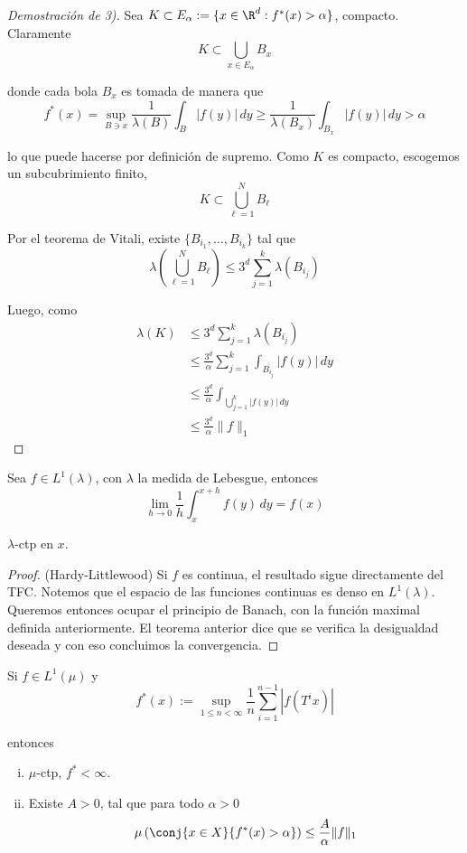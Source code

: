\documentclass[	docname= Sistemas\ Din\'amicos,
				finished=1,
				semester=1,
				year=2017,
				professor=Godofredo\ Iommi,
				sigla=MAT2565]{apunte}
\begin{document}
\begin{proof}[Demostración de 3)] Sea $K \subset E_{\alpha} := \{x \in \R^{d} : f^{*}(x) > \alpha\}$, compacto. Claramente
	$$K \subset \bigcup_{x \in E_{\alpha}} B_{x}$$

donde cada bola $B_{x}$ es tomada de manera que
	$$f^{*}(x) 
		=	\sup_{B \ni x} \frac{1}{\lambda(B)} \int_{B} |f(y)| \, dy 
		\geq	\frac{1}{\lambda(B_{x})} \int_{B_{x}} |f(y)| \, dy
		>	\alpha
	$$

lo que puede hacerse por definición de supremo. Como $K$ es compacto, escogemos un subcubrimiento finito,
	$$K \subset \bigcup_{\ell=1}^{N} B_{\ell}$$

Por el teorema de Vitali, existe $\{B_{i_{1}}, \ldots, B_{i_{k}}\}$ tal que
	$$\lambda\left(\bigcup_{\ell=1}^{N} B_{\ell}\right) \leq 3^{d} \sum_{j=1}^{k} \lambda(B_{i_{j}})$$

Luego, como 
	\begin{align*}
		\lambda(K) 
			&\leq		3^{d} \sum_{j=1}^{k} \lambda(B_{i_{j}})	\\
			&\leq		\frac{3^{d}}{\alpha}\sum_{j=1}^{k} \int_{B_{i_{j}}} |f(y)| \, dy	\\
			&\leq		\frac{3^{d}}{\alpha} \int_{\bigcup_{j=1}^{k} |f(y)| \, dy}	\\
			&\leq		\frac{3^{d}}{\alpha}\|f\|_{1}
	\end{align*}


\end{proof}

\begin{teo}[Lebesgue, 1910] Sea $f \in L^{1}(\lambda)$, con $\lambda$ la medida de Lebesgue, entonces
	$$\lim_{h \to 0} \frac{1}{h} \int_{x}^{x+h} f(y) \, dy = f(x)$$

$\lambda$-ctp en $x$.
\end{teo}

\begin{proof} (Hardy-Littlewood) Si $f$ es continua, el resultado sigue directamente del TFC. Notemos que el espacio de las funciones continuas es denso en $L^{1}(\lambda)$. Queremos entonces ocupar el principio de Banach, con la función maximal definida anteriormente. El teorema anterior dice que se verifica la desigualdad deseada y con eso concluimos la convergencia.
\end{proof}

\begin{teo} Si $f \in L^{1}(\mu)$ y 
	$$f^{*}(x) := \sup_{1 \leq n < \infty} \frac{1}{n} \sum_{i=1}^{n-1} |f(T^{i}x)|$$

entonces
	\begin{enumerate}[(i)]
		\item $\mu$-ctp, $f^{*} < \infty$.
		
		\item Existe $A > 0$, tal que para todo $\alpha > 0$
				$$\mu\left(\conj{x \in X}{f^{*}(x) > \alpha}\right) \leq \frac{A}{\alpha}\|f\|_{1}$$
	\end{enumerate}
\end{teo}
\end{document}
